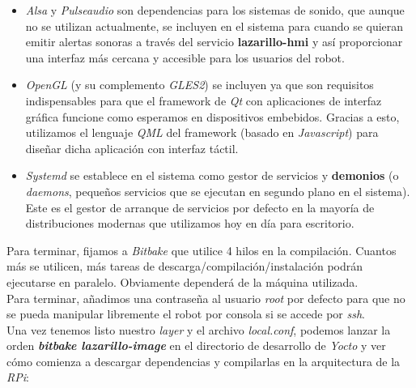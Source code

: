\begin{itemize}
	\item \textit{Alsa} y \textit{Pulseaudio} son dependencias para los sistemas de sonido, que aunque no se utilizan actualmente, se incluyen en el sistema para cuando se quieran emitir alertas sonoras a través del servicio \textbf{lazarillo-hmi} y así proporcionar una interfaz más cercana y accesible para los usuarios del robot.
	\item \textit{OpenGL} (y su complemento \textit{GLES2}) se incluyen ya que son requisitos indispensables para que el framework de \textit{Qt} con aplicaciones de interfaz gráfica funcione como esperamos en dispositivos embebidos. Gracias a esto, utilizamos el lenguaje \textit{QML} del framework (basado en \textit{Javascript}) para diseñar dicha aplicación con interfaz táctil.
	\item \textit{Systemd} se establece en el sistema como gestor de servicios y \textbf{demonios} (o \textit{daemons}, pequeños servicios que se ejecutan en segundo plano en el sistema). Este es el gestor de arranque de servicios por defecto en la mayoría de distribuciones modernas que utilizamos hoy en día para escritorio.
\end{itemize}

Para terminar, fijamos a \textit{Bitbake} que utilice 4 hilos en la compilación. Cuantos más se utilicen, más tareas de descarga/compilación/instalación podrán ejecutarse en paralelo. Obviamente dependerá de la máquina utilizada.\\

Para terminar, añadimos una contraseña al usuario \textit{root} por defecto para que no se pueda manipular libremente el robot por consola si se accede por \textit{ssh}.\\

Una vez tenemos listo nuestro \textit{layer} y el archivo \textit{local.conf}, podemos lanzar la orden \textbf{\textit{bitbake lazarillo-image}} en el directorio de desarrollo de \textit{Yocto} y ver cómo comienza a descargar dependencias y compilarlas en la arquitectura de la \textit{RPi}:

